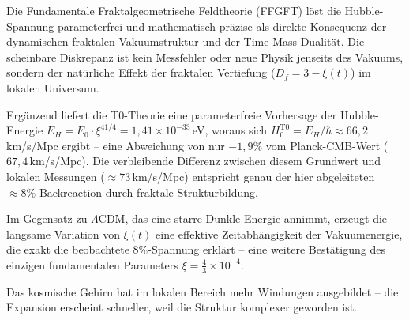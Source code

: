 	Die Fundamentale Fraktalgeometrische Feldtheorie (FFGFT) löst die Hubble-Spannung parameterfrei und mathematisch präzise als direkte Konsequenz der dynamischen fraktalen Vakuumstruktur und der Time-Mass-Dualität. Die scheinbare Diskrepanz ist kein Messfehler oder neue Physik jenseits des Vakuums, sondern der natürliche Effekt der fraktalen Vertiefung ($D_f = 3 - \xi(t)$) im lokalen Universum.
	
	Ergänzend liefert die T0-Theorie eine parameterfreie Vorhersage der Hubble-Energie $E_H = E_0 \cdot \xi^{41/4} = 1{,}41 \times 10^{-33}\,$eV, woraus sich $H_0^{\text{T0}} = E_H/\hbar \approx 66{,}2\,$km/s/Mpc ergibt -- eine Abweichung von nur $-1{,}9\%$ vom Planck-CMB-Wert ($67{,}4\,$km/s/Mpc). Die verbleibende Differenz zwischen diesem Grundwert und lokalen Messungen ($\approx 73\,$km/s/Mpc) entspricht genau der hier abgeleiteten $\approx 8\%$-Backreaction durch fraktale Strukturbildung.
	
	Im Gegensatz zu $\Lambda$CDM, das eine starre Dunkle Energie annimmt, erzeugt die langsame Variation von $\xi(t)$ eine effektive Zeitabhängigkeit der Vakuumenergie, die exakt die beobachtete 8\%-Spannung erklärt – eine weitere Bestätigung des einzigen fundamentalen Parameters $\xi = \frac{4}{3} \times 10^{-4}$.
	
	Das kosmische Gehirn hat im lokalen Bereich mehr Windungen ausgebildet – die Expansion erscheint schneller, weil die Struktur komplexer geworden ist.



